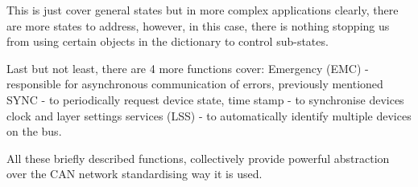 This is just cover general states but in more complex applications clearly, there are more states to address, however, in this case, there is nothing stopping us from using certain objects in the dictionary to control sub-states.

Last but not least, there are 4 more functions cover: Emergency (EMC) - responsible for asynchronous communication of errors, previously mentioned SYNC - to periodically request device state, time stamp - to synchronise devices clock and layer settings services (LSS) - to automatically identify multiple devices on the bus.

All these briefly described functions, collectively provide powerful abstraction over the CAN network standardising way it is used.

\cite{CAN_CIA,CANOpen_NIKHEF,CANOpen_solutions,CANOpen_microcontrol}
\\ \\ \\ \\ \\ \\ 



